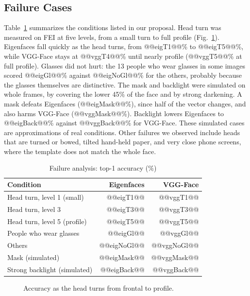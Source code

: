 \documentclass[conference,a4paper]{IEEEtran}
\begin{document}
\subsection{Failure Cases}
Table~\ref{tab:fail} summarizes the conditions listed in our proposal. Head turn was measured on FEI at five levels, from a small turn to full profile (Fig.~\ref{fig:turn}). Eigenfaces fall quickly as the head turns, from @@eigT1@@\% to @@eigT5@@\%, while VGG-Face stays at @@vggT4@@\% until nearly profile (@@vggT5@@\% at full profile). Glasses did not hurt: the 13 people who wear glasses in some images scored @@eigGl@@\% against @@eigNoGl@@\% for the others, probably because the glasses themselves are distinctive. The mask and backlight were simulated on whole frames, by covering the lower 45\% of the face and by strong darkening. A mask defeats Eigenfaces (@@eigMask@@\%), since half of the vector changes, and also harms VGG-Face (@@vggMask@@\%). Backlight lowers Eigenfaces to @@eigBack@@\% against @@vggBack@@\% for VGG-Face. These simulated cases are approximations of real conditions. Other failures we observed include heads that are turned or bowed, tilted hand-held paper, and very close phone screens, where the template does not match the whole face.

\begin{table}[t]
\caption{Failure analysis: top-1 accuracy (\%)}
\label{tab:fail}
\centering\footnotesize
\begin{tabular}{@{}lrr@{}}
\toprule
Condition & Eigenfaces & VGG-Face \\
\midrule
Head turn, level 1 (small) & @@eigT1@@ & @@vggT1@@ \\
Head turn, level 3 & @@eigT3@@ & @@vggT3@@ \\
Head turn, level 5 (profile) & @@eigT5@@ & @@vggT5@@ \\
People who wear glasses & @@eigGl@@ & @@vggGl@@ \\
Others & @@eigNoGl@@ & @@vggNoGl@@ \\
Mask (simulated) & @@eigMask@@ & @@vggMask@@ \\
Strong backlight (simulated) & @@eigBack@@ & @@vggBack@@ \\
\bottomrule
\end{tabular}
\end{table}

\begin{figure}[t]
\centering
{}
\caption{Accuracy as the head turns from frontal to profile.}
\label{fig:turn}
\end{figure}
\end{document}
